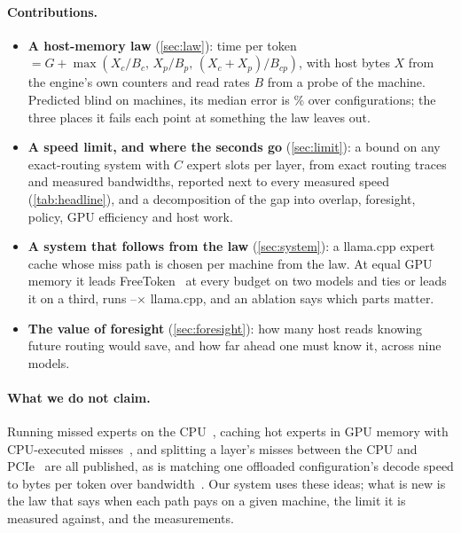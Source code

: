 \documentclass[10pt,twocolumn]{article}
\begin{document}
\paragraph{Contributions.}
\begin{itemize}\setlength\itemsep{1pt}
\item \textbf{A host-memory law} (\cref{sec:law}): time per token $=G+\max(X_c/B_c,\,X_p/B_p,\,(X_c{+}X_p)/B_{cp})$,
with host bytes $X$ from the engine's own counters and read rates $B$ from a probe of the machine. Predicted blind on
\lawHosts{} machines, its median error is \lawMedian\% over \lawCfg{} configurations; the three places it fails each
point at something the law leaves out.
\item \textbf{A speed limit, and where the seconds go} (\cref{sec:limit}): a bound on any exact-routing system with $C$
expert slots per layer, from exact routing traces and measured bandwidths, reported next to every measured speed
(\cref{tab:headline}), and a decomposition of the gap into overlap, foresight, policy, GPU efficiency and host work.
\item \textbf{A system that follows from the law} (\cref{sec:system}): a llama.cpp expert cache whose miss path is
chosen per machine from the law. At equal GPU memory it leads FreeToken~\cite{freetoken} at every budget on two models
and ties or leads it on a third, runs \llamaXMin--\llamaXMax$\times$ llama.cpp, and an ablation says which parts matter.
\item \textbf{The value of foresight} (\cref{sec:foresight}): how many host reads knowing future routing would save,
and how far ahead one must know it, across nine models.
\end{itemize}

\paragraph{What we do not claim.} Running missed experts on the CPU~\cite{kamahori2024fiddler,ktransformers},
caching hot experts in GPU memory with CPU-executed misses~\cite{zhong2025hybrimoe,huang2025cpugpu,llamacppdisc24528},
and splitting a layer's misses between the CPU and PCIe~\cite{freetoken,dali2026} are all published, as is matching
one offloaded configuration's decode speed to bytes per token over bandwidth~\cite{cacheable}. Our
system uses these ideas; what is new is the law that says when each path pays on a given machine, the limit it is
measured against, and the measurements.


\end{document}
